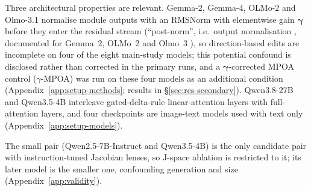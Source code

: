 
Three architectural properties are relevant. Gemma-2, Gemma-4, OLMo-2 and Olmo-3.1
normalise module outputs with an RMSNorm \cite{zhang2019rmsnorm} with
elementwise gain $\boldsymbol{\gamma}$ before they enter the residual stream
(``post-norm'', i.e.\ output normalisation \cite{kim2025periln}, documented for
Gemma~2, OLMo~2 and Olmo~3
\cite{gemmateam2024gemma2,walsh2025olmo2,olmo2025olmo3}), so direction-based edits are
incomplete on four of the eight main-study models; this potential confound is
disclosed rather than corrected in the primary runs, and a
$\boldsymbol{\gamma}$-corrected MPOA control ($\gamma$-MPOA) was run on these
four models as an additional condition (Appendix~\ref{app:setup-methods};
results in \S\ref{sec:res-secondary}). Qwen3.8-27B and Qwen3.5-4B
interleave gated-delta-rule linear-attention layers \cite{yang2025gated} with
full-attention layers, and four checkpoints are image-text
models used with text only (Appendix~\ref{app:setup-models}).

The small pair (Qwen2.5-7B-Instruct and Qwen3.5-4B) is the only candidate
pair with instruction-tuned Jacobian lenses, so J-space ablation is restricted
to it; its later model is the smaller one, confounding generation and size
(Appendix~\ref{app:validity}).

